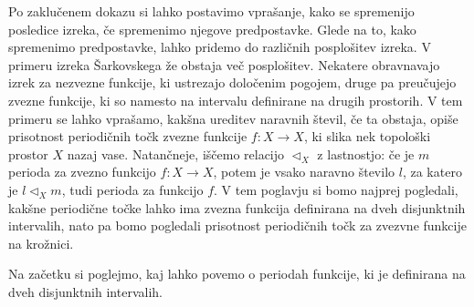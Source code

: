 \documentclass[../TG_magistrsko_delo_sections.tex]{subfiles}
\begin{document}
Po zaklučenem dokazu si lahko postavimo vprašanje, kako se spremenijo posledice izreka, če spremenimo njegove predpostavke. Glede na to, kako spremenimo predpostavke, lahko pridemo do različnih posplošitev izreka. V primeru izreka Šarkovskega že obstaja več posplošitev. Nekatere obravnavajo izrek za nezvezne funkcije, ki ustrezajo določenim pogojem, druge pa preučujejo zvezne funkcije, ki so namesto na intervalu definirane na drugih prostorih. V tem primeru se lahko vprašamo, kakšna ureditev naravnih števil, če ta obstaja, opiše prisotnost periodičnih točk zvezne funkcije $f:X \to X$, ki slika nek topološki prostor $X$ nazaj vase.  Natančneje, iščemo relacijo $\triangleleft_X$ z lastnostjo: če je $m$ perioda za zvezno funkcijo $f:X \to X$, potem je vsako naravno število $l$, za katero je $l \triangleleft_X m$, tudi perioda za funkcijo $f$.
V tem poglavju si bomo najprej pogledali, kakšne periodične točke lahko ima zvezna funkcija definirana na dveh disjunktnih intervalih, nato pa bomo pogledali prisotnost periodičnih točk za zvezvne funkcije na krožnici.

Na začetku si poglejmo, kaj lahko povemo o periodah funkcije, ki je definirana na dveh disjunktnih intervalih.
\end{document}
